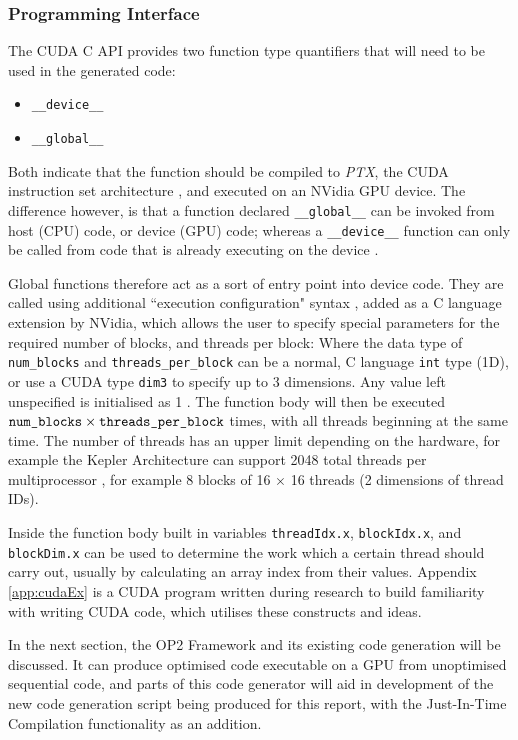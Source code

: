 \subsubsection{Programming Interface}
The CUDA C API provides two function type quantifiers that will need to be used in the generated code:
\begin{itemize}
\vspace{-.5cm}
\setlength{\itemsep}{0pt}%
\setlength{\parskip}{0pt}%
\item{\verb|__device__|}
\item{\verb|__global__|}
\vspace{-.5cm}
\end{itemize}
Both indicate that the function should be compiled to \textit{PTX}, the CUDA instruction set architecture \cite[p15]{guide}, and executed on an NVidia GPU device. The difference however, is that a function declared \verb|__global__| can be invoked from host (CPU) code, or device (GPU) code; whereas a \verb|__device__| function can only be called from code that is already executing on the device \cite[p81]{guide}.
\par
Global functions therefore act as a sort of entry point into device code. They are called using additional ``execution configuration" syntax \cite[p7]{guide}, added as a C language extension by NVidia, which allows the user to specify special parameters for the required number of blocks, and threads per block:
\noindent Where the data type of \verb|num_blocks| and \verb|threads_per_block| can be a normal, C language \verb|int| type (1D), or use a CUDA type \verb|dim3| \cite[p9]{guide} to specify up to 3 dimensions. Any value left unspecified is initialised as 1 \cite[p87]{guide}. The function body will then be executed $\verb|num_blocks| \times \verb|threads_per_block|$ times, with all threads beginning at the same time. The number of threads has an upper limit depending on the hardware, for example the Kepler Architecture can support 2048 total threads per multiprocessor \cite{kepler}, for example 8 blocks of 16 $\times$ 16 threads (2 dimensions of thread IDs).
\par
Inside the function body built in variables \verb|threadIdx.x|, \verb|blockIdx.x|, and \verb|blockDim.x| can be used to determine the work which a certain thread should carry out, usually by calculating an array index from their values. Appendix \ref{app:cudaEx} is a CUDA program written during research to build familiarity with writing CUDA code, which utilises these constructs and ideas.
\par
In the next section, the OP2 Framework and its existing code generation will be discussed. It can produce optimised code executable on a GPU from unoptimised sequential code, and parts of this code generator will aid in development of the new code generation script being produced for this report, with the Just-In-Time Compilation functionality as an addition.

